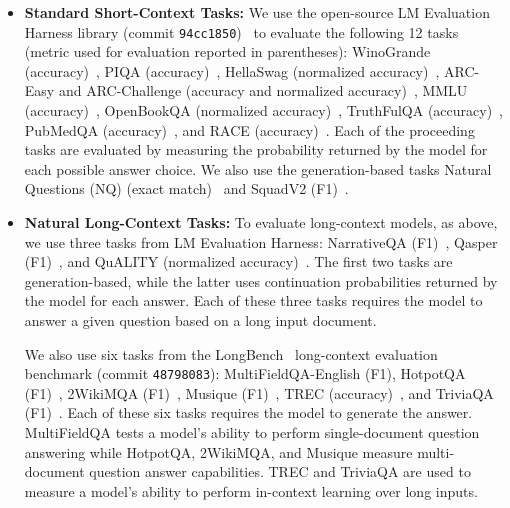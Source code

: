 \begin{itemize}
    \item \textbf{Standard Short-Context Tasks:} We use the open-source LM Evaluation Harness library (commit \texttt{94cc1850})~\citep{eval-harness} to evaluate the following 12 tasks (metric used for evaluation reported in parentheses): WinoGrande (accuracy)~\citep{sakaguchi2021winogrande}, PIQA (accuracy)~\citep{bisk2020piqa}, HellaSwag (normalized accuracy)~\citep{zellers2019hellaswag}, ARC-Easy and ARC-Challenge (accuracy and normalized accuracy)~\citep{clark2018think}, MMLU (accuracy)~\citep{hendrycks2020measuring}, OpenBookQA (normalized accuracy)~\citep{mihaylov2018can}, TruthFulQA (accuracy)~\citep{lin2021truthfulqa}, PubMedQA (accuracy)~\citep{jin2019pubmedqa}, and RACE (accuracy)~\citep{lai2017race}. Each of the proceeding tasks are evaluated by measuring the probability returned by the model for each possible answer choice. We also use the generation-based tasks Natural Questions (NQ) (exact match)~\citep{lee2019latent} and SquadV2 (F1)~\citep{rajpurkar2018know}.

    \item \textbf{Natural Long-Context Tasks:} To evaluate long-context models, as above, we use three tasks from LM Evaluation Harness: NarrativeQA (F1)~\citep{kovcisky2018narrativeqa}, Qasper (F1)~\citep{dasigi2021dataset}, and QuALITY (normalized accuracy)~\citep{shaham2022scrolls}. The first two tasks are generation-based, while the latter uses continuation probabilities returned by the model for each answer. Each of these three tasks requires the model to answer a given question based on a long input document. 

    We also use six tasks from the LongBench~\citep{bai2023longbench} long-context evaluation benchmark (commit \texttt{48798083}): MultiFieldQA-English (F1), HotpotQA (F1)~\citep{yang2018hotpotqa}, 2WikiMQA (F1)~\citep{ho2020constructing}, Musique (F1)~\citep{trivedi2022musique}, TREC (accuracy)~\citep{li2002learning}, and TriviaQA (F1)~\citep{joshi2017triviaqa}. Each of these six tasks requires the model to generate the answer. MultiFieldQA tests a model's ability to perform single-document question answering while HotpotQA, 2WikiMQA, and Musique measure multi-document question answer capabilities. TREC and TriviaQA are used to measure a model's ability to perform in-context learning over long inputs.


\end{itemize}
